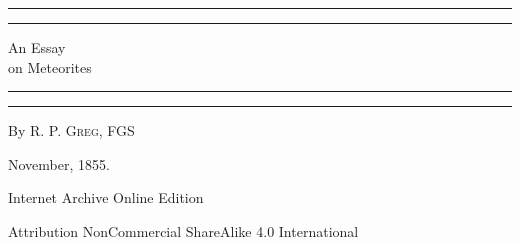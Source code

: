 \documentclass[a4paper, 12pt, oneside]{article}
\begin{document}
\begin{titlepage} %
	\centering %
	\scshape %

	
	\rule{\textwidth}{1.6pt}\vspace*{-\baselineskip}\vspace*{2pt} %
	\rule{\textwidth}{0.4pt} %
	
	\vspace{0.75\baselineskip} %

        {\LARGE An Essay \\ on Meteorites \\} %
	
	\vspace{0.75\baselineskip} %
	
	\rule{\textwidth}{0.4pt}\vspace*{-\baselineskip}\vspace{3.2pt} %
	\rule{\textwidth}{1.6pt} %
	
	\vspace{1\baselineskip} %
	
	
	{By \scshape\Large R. P. Greg, FGS \\} %
	
	\vspace*{1\baselineskip} %
	

	\vspace{1\baselineskip} %

	
	
		
	\vspace*{\fill}%
	
	November, 1855.%
	
	\vspace{1\baselineskip} %

        Internet Archive Online Edition  %
	
	{\small Attribution NonCommercial ShareAlike 4.0 International } %
\end{titlepage}
\setlength{\parskip}{1mm plus1mm minus1mm}
\setcounter{tocdepth}{3}
\setcounter{secnumdepth}{3}
\tableofcontents
\clearpage
\end{document}
